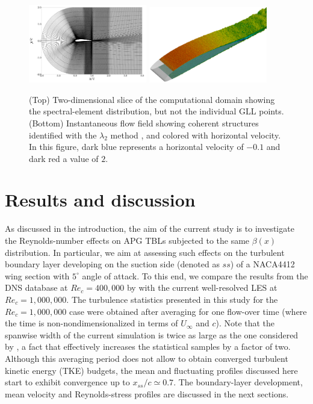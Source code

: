 \documentclass[preprint,12pt,authoryear]{elsarticle}
\begin{document}
\begin{figure}[t]
\centering
\includegraphics[width=0.46\textwidth]{wing_mesh}
\includegraphics[width=0.46\textwidth]{wing_visualization}
\caption{(Top) Two-dimensional slice of the computational domain showing the spectral-element distribution, but not the individual GLL points. (Bottom) Instantaneous flow field showing coherent structures identified with the $\lambda_{2}$ method \citep{jeong_hussain}, and colored with horizontal velocity. In this figure, dark blue represents a horizontal velocity of $-0.1$ and dark red a value of $2$.}
\label{flow_field}
\end{figure}

\section{Results and discussion} 
  
As discussed in the introduction, the aim of the current study is to investigate the Reynolds-number effects on APG TBLs subjected to the same $\beta(x)$ distribution. In particular, we aim at assessing such effects on the turbulent boundary layer developing on the suction side (denoted as $ss$) of a NACA4412 wing section with $5^{\circ}$ angle of attack. To this end, we compare the results from the DNS database at $Re_{c}=400,000$ by \cite{hosseini_et_al} with the current well-resolved LES at $Re_{c}=1,000,000$. The turbulence statistics presented in this study for the $Re_{c}=1,000,000$ case were obtained after averaging for one flow-over time (where the time is non-nondimensionalized in terms of $U_{\infty}$ and $c$). Note that the spanwise width of the current simulation is twice as large as the one considered by \cite{hosseini_et_al}, a fact that effectively increases the statistical samples by a factor of two. Although this averaging period does not allow to obtain converged turbulent kinetic energy (TKE) budgets, the mean and fluctuating profiles discussed here start to exhibit convergence up to $x_{ss} /c \simeq 0.7$. The boundary-layer development, mean velocity and Reynolds-stress profiles are discussed in the next sections.
\end{document}
